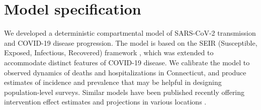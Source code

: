 \documentclass[11pt]{article}
\begin{document}






\section{Model specification}

We developed a deterministic compartmental model of SARS-CoV-2 transmission and COVID-19 disease progression.
The model is based on the SEIR (Susceptible, Exposed, Infectious, Recovered) framework \citep{keeling2011modeling}, which was extended to accommodate distinct features of COVID-19 disease. We calibrate the model to observed dynamics of deaths and hospitalizations in Connecticut, and produce estimates of incidence and prevalence that may be helpful in designing population-level surveys. Similar models have been published recently offering intervention effect estimates and projections in various locations \citep{cdc2020covid19forecasts, li2020substantial, kissler2020projecting, childs2020impact, salje2020estimating, salomon2020defining}.
\end{document}
